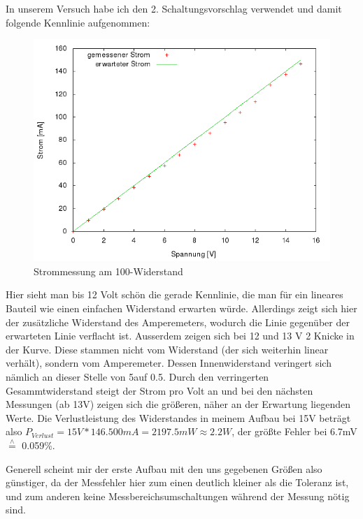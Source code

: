 In unserem Versuch habe ich den 2. Schaltungsvorschlag verwendet und damit folgende Kennlinie aufgenommen:
\begin{figure}[H] %
	\centering
	\includegraphics[width=\linewidth]{versuch1/versuch_1_1}
	\caption{Strommessung am 100\Omega-Widerstand}
\end{figure}
Hier sieht man bis 12 Volt schön die gerade Kennlinie, die man für ein lineares Bauteil wie einen einfachen Widerstand erwarten würde. Allerdings zeigt sich hier der zusätzliche Widerstand des Amperemeters, wodurch die Linie gegenüber der erwarteten Linie verflacht ist.
Ausserdem zeigen sich bei 12 und 13 V 2 Knicke in der Kurve. Diese stammen nicht vom Widerstand (der sich weiterhin linear verhält), sondern vom Amperemeter. Dessen Innenwiderstand veringert sich nämlich an dieser Stelle von 5\Omega auf 0.5\Omega. Durch den verringerten Gesammtwiderstand steigt der Strom pro Volt an und bei den nächsten Messungen (ab 13V) zeigen sich die größeren, näher an der Erwartung liegenden Werte.
Die Verlustleistung des Widerstandes in meinem Aufbau bei 15V beträgt also $P_{Verlust} = 15V * 146.500mA = 2197.5 mW \approx 2.2W$,
der größte Fehler bei 6.7mV $\stackrel{\wedge}{=}$ 0.059\%.

Generell scheint mir der erste Aufbau mit den uns gegebenen Größen also günstiger, da der Messfehler hier zum einen deutlich kleiner als die Toleranz ist, und zum anderen keine Messbereichsumschaltungen während der Messung nötig sind.

